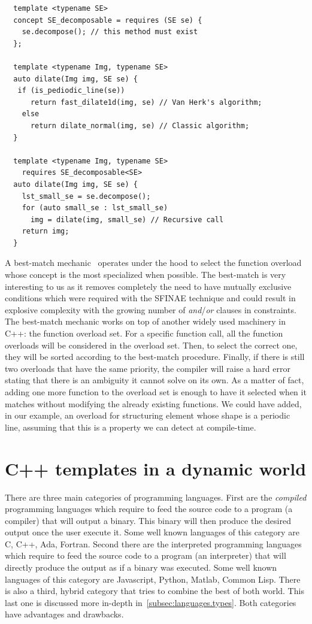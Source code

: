 \begin{verbatim}
  template <typename SE>
  concept SE_decomposable = requires (SE se) {
    se.decompose(); // this method must exist
  };

  template <typename Img, typename SE>
  auto dilate(Img img, SE se) {
   if (is_pediodic_line(se))
      return fast_dilate1d(img, se) // Van Herk's algorithm;
    else
      return dilate_normal(img, se) // Classic algorithm;
  }

  template <typename Img, typename SE>
    requires SE_decomposable<SE>
  auto dilate(Img img, SE se) {
    lst_small_se = se.decompose();
    for (auto small_se : lst_small_se)
      img = dilate(img, small_se) // Recursive call
    return img;
  }
\end{verbatim}
A best-match mechanic~\parencite{dosries.2006.specifying.proc} operates under the hood to select the function overload
whose concept is the most specialized when possible. The best-match is very interesting to us as it removes completely
the need to have mutually exclusive conditions which were required with the SFINAE technique and could result in
explosive complexity with the growing number of \emph{and}/\emph{or} clauses in constraints. The best-match mechanic
works on top of another widely used machinery in C++: the function overload set. For a specific function call, all the
function overloads will be considered in the overload set. Then, to select the correct one, they will be sorted
according to the best-match procedure. Finally, if there is still two overloads that have the same priority, the
compiler will raise a hard error stating that there is an ambiguity it cannot solve on its own. As a matter of fact,
adding one more function to the overload set is enough to have it selected when it matches without modifying the already
existing functions. We could have added, in our example, an overload for structuring element whose shape is a periodic
line, assuming that this is a property we can detect at compile-time.

\section{C++ templates in a dynamic world}
\label{sec:template.dynworld}

There are three main categories of programming languages. First are the \emph{compiled} programming languages which
require to feed the source code to a program (a compiler) that will output a binary. This binary will then produce the
desired output once the user execute it. Some well known languages of this category are C, C++, Ada, Fortran. Second
there are the interpreted programming languages which require to feed the source code to a program (an interpreter) that
will directly produce the output as if a binary was executed. Some well known languages of this category are Javascript,
Python, Matlab, Common Lisp. There is also a third, hybrid category that tries to combine the best of both world. This
last one is discussed more in-depth in~\cref{subsec:languages.types}. Both categories have advantages and drawbacks.

